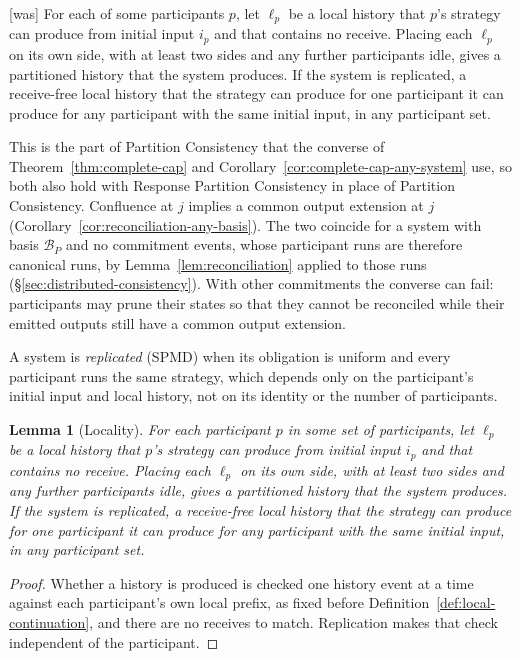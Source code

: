 \documentclass[sigconf]{cidr-2027}
\newtheorem{lemma}{Lemma}
\theoremstyle{remark}
\newcommand{\commitment}{commitment\xspace}
\newcommand{\commitments}{commitments\xspace}
\newcommand{\outnoun}{output extension\xspace}%
\begin{document}
{\footnotesize\color{black!50}\noindent\textsf{[was]} For each of some participants $p$, let $\ell_p$ be a local history that $p$'s
strategy can produce from initial input $i_p$ and that contains no receive.
Placing each $\ell_p$ on its own side, with at least two sides and
any further participants
idle, gives a partitioned history that the system produces.  If the system is
replicated, a receive-free local history that the strategy can produce for one participant
it can produce for any participant with the same initial input, in any
participant set.\par}

\color{blue!70!black}This is the part of Partition Consistency that the converse of
Theorem~\ref{thm:complete-cap} and Corollary~\ref{cor:complete-cap-any-system}
use, so both also hold with Response
Partition Consistency in place of Partition Consistency.  Confluence at $j$
implies a common \outnoun at $j$ (Corollary~\ref{cor:reconciliation-any-basis}).
The two coincide for a system with basis $\mathcal B_P$ and no \commitment
events, whose participant runs are therefore canonical runs, by
Lemma~\ref{lem:reconciliation} applied to those runs
(\S\ref{sec:distributed-consistency}).  With other \commitments the
converse can fail: participants may prune their states so that they cannot
be reconciled while their emitted outputs still have a common \outnoun.\color{black}

\color{blue!70!black}A system is \emph{replicated} (SPMD) when its obligation is uniform and every
participant runs the same strategy, which depends only on the participant's
initial input and local history, not on its identity or the number of
participants.\color{black}

\color{blue!70!black}\begin{lemma}[Locality]
\label{lem:locality}
For each participant $p$ in some set of participants, let $\ell_p$ be a local
history that $p$'s
strategy can produce from initial input $i_p$ and that contains no receive.
Placing each $\ell_p$ on its own side, with at least two sides and
any further participants
idle, gives a partitioned history that the system produces.  If the system is
replicated, a receive-free local history that the strategy can produce for one participant
it can produce for any participant with the same initial input, in any
participant set.\color{black}
\end{lemma}

\begin{proof}
Whether a history is produced is checked one history event at a time against each
participant's own local prefix, as fixed before
Definition~\ref{def:local-continuation},
and there are no receives to match.
Replication makes that check independent of the participant.
\end{proof}
\end{document}
